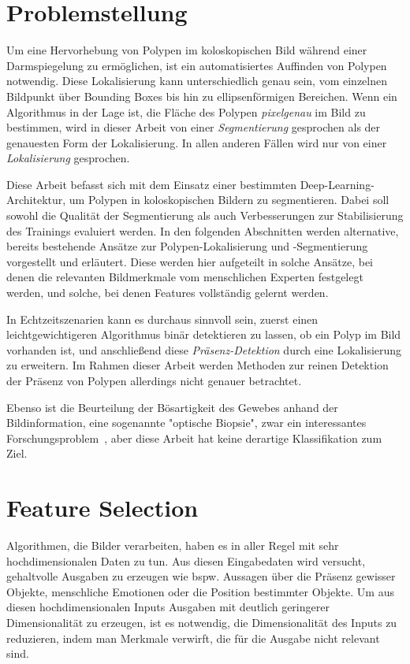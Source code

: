 \section{Problemstellung}

Um eine Hervorhebung von Polypen im koloskopischen Bild während einer Darmspiegelung zu ermöglichen, ist ein automatisiertes Auffinden von Polypen notwendig.
Diese Lokalisierung kann unterschiedlich genau sein, vom einzelnen Bildpunkt über Bounding Boxes bis hin zu ellipsenförmigen Bereichen.
Wenn ein Algorithmus in der Lage ist, die Fläche des Polypen \emph{pixelgenau} im Bild zu bestimmen, wird in dieser Arbeit von einer \emph{Segmentierung} gesprochen als der genauesten Form der Lokalisierung.
In allen anderen Fällen wird nur von einer \emph{Lokalisierung} gesprochen.

Diese Arbeit befasst sich mit dem Einsatz einer bestimmten Deep-Learning-Architektur, um Polypen in koloskopischen Bildern zu segmentieren.
Dabei soll sowohl die Qualität der Segmentierung als auch Verbesserungen zur Stabilisierung des Trainings evaluiert werden.
In den folgenden Abschnitten werden alternative, bereits bestehende Ansätze zur Polypen-Lokalisierung und -Segmentierung vorgestellt und erläutert.
Diese werden hier aufgeteilt in solche Ansätze, bei denen die relevanten Bildmerkmale vom menschlichen Experten festgelegt werden, und solche, bei denen Features vollständig gelernt werden.

In Echtzeitszenarien kann es durchaus sinnvoll sein, zuerst einen leichtgewichtigeren Algorithmus binär detektieren zu lassen, ob ein Polyp im Bild vorhanden ist, und anschließend diese \emph{Präsenz-Detektion} durch eine Lokalisierung zu erweitern.
Im Rahmen dieser Arbeit werden Methoden zur reinen Detektion der Präsenz von Polypen allerdings nicht genauer betrachtet.

Ebenso ist die Beurteilung der Bösartigkeit des Gewebes anhand der Bildinformation, eine sogenannte "optische Biopsie", zwar ein interessantes Forschungsproblem~\cite{Roy.2011}, aber diese Arbeit hat keine derartige Klassifikation zum Ziel.



\section{Feature Selection}

Algorithmen, die Bilder verarbeiten, haben es in aller Regel mit sehr hochdimensionalen Daten zu tun.
Aus diesen Eingabedaten wird versucht, gehaltvolle Ausgaben zu erzeugen wie bspw. Aussagen über die Präsenz gewisser Objekte, menschliche Emotionen oder die Position bestimmter Objekte.
Um aus diesen hochdimensionalen Inputs Ausgaben mit deutlich geringerer Dimensionalität zu erzeugen, ist es notwendig, die Dimensionalität des Inputs zu reduzieren, indem man Merkmale verwirft, die für die Ausgabe nicht relevant sind.

